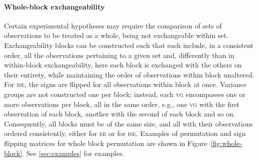 \paragraph{Whole-block exchangeability}

Certain experimental hypotheses may require the comparison of sets of observations to be treated as a whole, being not exchangeable within set. Exchangeability blocks can be constructed such that each include, in a consistent order, all the observations pertaining to a given set and, differently than in within-block exchangeability, here each block is exchanged with the others on their entirety, while maintaining the order of observations within block unaltered. For \textsc{ise}, the signs are flipped for all observations within block at once. Variance groups are not constructed one per block; instead, each \textsc{vg} encompasses one or more observations per block, all in the same order, e.g., one \textsc{vg} with the first observation of each block, another with the second of each block and so on. Consequently, all blocks must be of the same size, and all with their observations ordered consistently, either for \textsc{ee} or for \textsc{ise}. Examples of permutation and sign flipping matrices for whole block permutation are shown in Figure~\ref{fig:whole-block}. See \ref{sec:examples} for examples.

